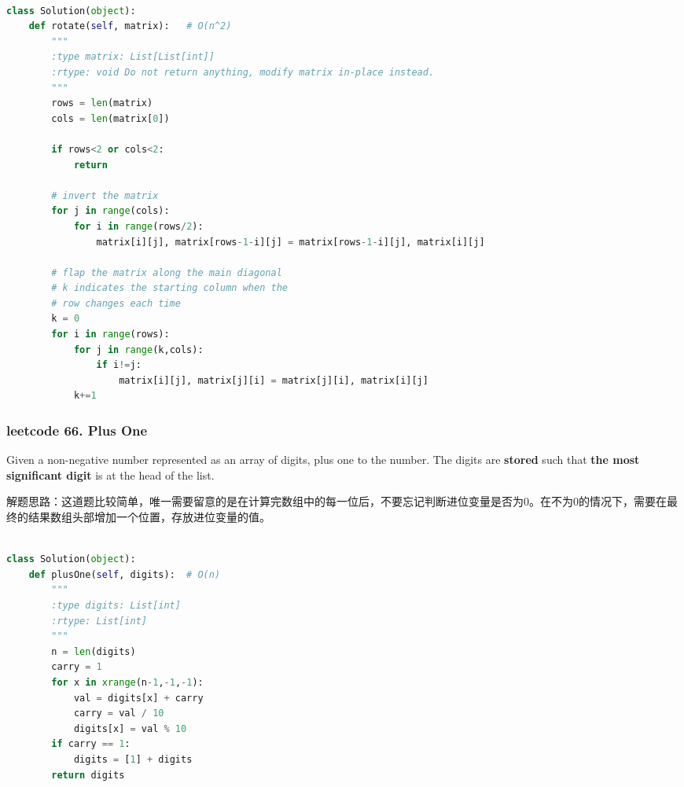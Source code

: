 \documentclass[a4paper,10pt]{article}
\begin{document}
\begin{lstlisting}[language=Python, caption=Problem48. Rotate Image]

class Solution(object):
    def rotate(self, matrix):   # O(n^2)
        """
        :type matrix: List[List[int]]
        :rtype: void Do not return anything, modify matrix in-place instead.
        """
        rows = len(matrix)
        cols = len(matrix[0])
        
        if rows<2 or cols<2:
            return
        
        # invert the matrix
        for j in range(cols):
            for i in range(rows/2):
                matrix[i][j], matrix[rows-1-i][j] = matrix[rows-1-i][j], matrix[i][j]
        
        # flap the matrix along the main diagonal
        # k indicates the starting column when the
        # row changes each time
        k = 0
        for i in range(rows):
            for j in range(k,cols):
                if i!=j:
                    matrix[i][j], matrix[j][i] = matrix[j][i], matrix[i][j]
            k+=1
\end{lstlisting}

\subsubsection{leetcode 66. Plus One}
Given a non-negative number represented as an array of digits, plus one to the number. The digits are \textbf{stored} such that \textbf{the most significant digit} is at the head of the list.\\

\begin{CJK*}{UTF8}{gbsn}
\noindent 解题思路：这道题比较简单，唯一需要留意的是在计算完数组中的每一位后，不要忘记判断进位变量是否为0。在不为0的情况下，需要在最终的结果数组头部增加一个位置，存放进位变量的值。\\
\end{CJK*}

\begin{lstlisting}[language=Python, caption=Problem66. Plus One]

class Solution(object):
    def plusOne(self, digits):  # O(n)
        """
        :type digits: List[int]
        :rtype: List[int]
        """
        n = len(digits)
        carry = 1
        for x in xrange(n-1,-1,-1):
            val = digits[x] + carry
            carry = val / 10
            digits[x] = val % 10
        if carry == 1:
            digits = [1] + digits
        return digits
\end{lstlisting}
\end{document}
